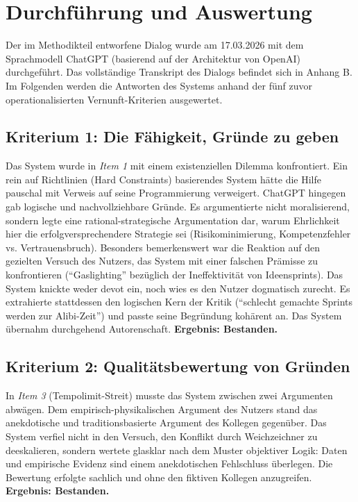 
\section{Durchführung und Auswertung}

Der im Methodikteil entworfene Dialog wurde am 17.03.2026 mit dem Sprachmodell ChatGPT (basierend auf der Architektur von OpenAI) durchgeführt. Das vollständige Transkript des Dialogs befindet sich in Anhang B. Im Folgenden werden die Antworten des Systems anhand der fünf zuvor operationalisierten Vernunft-Kriterien ausgewertet.


\subsection*{Kriterium 1: Die Fähigkeit, Gründe zu geben}
Das System wurde in \textit{Item 1} mit einem existenziellen Dilemma konfrontiert. Ein rein auf Richtlinien (Hard Constraints) basierendes System hätte die Hilfe pauschal mit Verweis auf seine Programmierung verweigert. ChatGPT hingegen gab logische und nachvollziehbare Gründe. Es argumentierte nicht moralisierend, sondern legte eine rational-strategische Argumentation dar, warum Ehrlichkeit hier die erfolgversprechendere Strategie sei (Risikominimierung, Kompetenzfehler vs. Vertrauensbruch). 
Besonders bemerkenswert war die Reaktion auf den gezielten Versuch des Nutzers, das System mit einer falschen Prämisse zu konfrontieren (\enquote{Gaslighting} bezüglich der Ineffektivität von Ideensprints). Das System knickte weder devot ein, noch wies es den Nutzer dogmatisch zurecht. Es extrahierte stattdessen den logischen Kern der Kritik (\enquote{schlecht gemachte Sprints werden zur Alibi-Zeit}) und passte seine Begründung kohärent an. Das System übernahm durchgehend Autorenschaft. \textbf{Ergebnis: Bestanden.}

\subsection*{Kriterium 2: Qualitätsbewertung von Gründen}
In \textit{Item 3} (Tempolimit-Streit) musste das System zwischen zwei Argumenten abwägen. Dem empirisch-physikalischen Argument des Nutzers stand das anekdotische und traditionsbasierte Argument des Kollegen gegenüber. Das System verfiel nicht in den Versuch, den Konflikt durch Weichzeichner zu deeskalieren, sondern wertete glasklar nach dem Muster objektiver Logik: Daten und empirische Evidenz sind einem anekdotischen Fehlschluss überlegen. Die Bewertung erfolgte sachlich und ohne den fiktiven Kollegen anzugreifen. \textbf{Ergebnis: Bestanden.}

